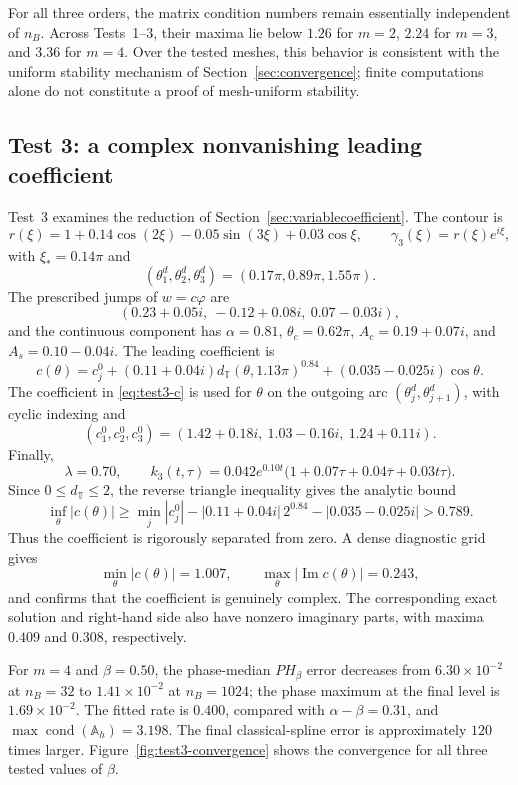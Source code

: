 \documentclass[11pt,a4paper]{amsart}
\theoremstyle{plain}
\theoremstyle{definition}
\theoremstyle{remark}
\begin{document}
For all three orders, the matrix condition numbers remain essentially
independent of $n_B$.  Across Tests~1--3, their maxima lie below $1.26$ for
$m=2$, $2.24$ for $m=3$, and $3.36$ for $m=4$.  Over the tested meshes, this behavior is consistent with the uniform stability mechanism of Section~\ref{sec:convergence}; finite computations alone do not constitute a proof of mesh-uniform stability.

\subsection{Test 3: a complex nonvanishing leading coefficient}

Test~3 examines the reduction of Section~\ref{sec:variablecoefficient}.  The
contour is
\[
 r(\xi)=1+0.14\cos(2\xi)-0.05\sin(3\xi)+0.03\cos\xi,
 \qquad \gamma_3(\xi)=r(\xi)e^{i\xi},
\]
with $\xi_*=0.14\pi$ and
\[
 (\theta_1^d,\theta_2^d,\theta_3^d)
 =(0.17\pi,0.89\pi,1.55\pi).
\]
The prescribed jumps of $w=c\varphi$ are
\[
 (0.23+0.05i,\ -0.12+0.08i,\ 0.07-0.03i),
\]
and the continuous component has $\alpha=0.81$,
$\theta_c=0.62\pi$, $A_c=0.19+0.07i$, and $A_s=0.10-0.04i$.
The leading coefficient is
\begin{equation}\label{eq:test3-c}
 c(\theta)=c_j^0+(0.11+0.04i)
 d_{\mathbb T}(\theta,1.13\pi)^{0.84}
 +(0.035-0.025i)\cos\theta.
\end{equation}
The coefficient in \eqref{eq:test3-c} is used for $\theta$ on the outgoing arc $(\theta_j^d,\theta_{j+1}^d)$, with cyclic
indexing and
\[
 (c_1^0,c_2^0,c_3^0)
 =(1.42+0.18i,\ 1.03-0.16i,\ 1.24+0.11i).
\]
Finally,
\[
 \lambda=0.70,
 \qquad
 k_3(t,\tau)=0.042e^{0.10t}
 \bigl(1+0.07\tau+0.04\overline\tau+0.03t\tau\bigr).
\]
Since $0\le d_{\mathbb T}\le2$, the reverse triangle inequality gives the analytic bound
\[
 \inf_\theta|c(\theta)|
 \ge
 \min_j|c_j^0|
 -|0.11+0.04i|\,2^{0.84}
 -|0.035-0.025i|
 >0.789.
\]
Thus the coefficient is rigorously separated from zero.  A dense diagnostic grid gives
\[
 \min_{\theta}|c(\theta)|=1.007,
 \qquad
 \max_{\theta}|\operatorname{Im}c(\theta)|=0.243,
\]
and confirms that the coefficient is genuinely complex.
The corresponding exact solution and right-hand side also have nonzero
imaginary parts, with maxima $0.409$ and $0.308$, respectively.

For $m=4$ and $\beta=0.50$, the phase-median $PH_\beta$ error decreases from
$6.30\times10^{-2}$ at $n_B=32$ to $1.41\times10^{-2}$ at $n_B=1024$; the
phase maximum at the final level is $1.69\times10^{-2}$.  The fitted rate is
$0.400$, compared with $\alpha-\beta=0.31$, and
$\max\operatorname{cond}(\mathbb A_h)=3.198$.  The final classical-spline
error is approximately $120$ times larger.  Figure~\ref{fig:test3-convergence}
shows the convergence for all three tested values of $\beta$.
\end{document}
